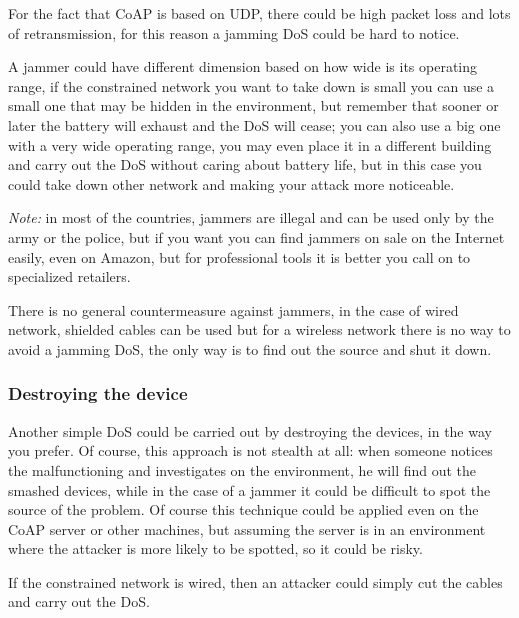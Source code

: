 	For the fact that CoAP is based on UDP, there could be high packet loss and lots of retransmission, for this reason a jamming DoS could be hard to notice.\newline
	
	A jammer could have different dimension based on how wide is its operating range, if the constrained network you want to take down is small you can use a small one that may be hidden in the environment, but remember that sooner or later the battery will exhaust and the DoS will cease; you can also use a big one with a very wide operating range, you may even place it in a different building and carry out the DoS without caring about battery life, but in this case you could take down other network and making your attack more noticeable.\newline
	
	\emph{Note:} in most of the countries, jammers are illegal and can be used only by the army or the police, but if you want you can find jammers on sale on the Internet easily, even on Amazon, but for professional tools it is better you call on to specialized retailers.\newline
	
	There is no general countermeasure against jammers, in the case of wired network, shielded cables can be used but for a wireless network there is no way to avoid a jamming DoS, the only way is to find out the source and shut it down.\newline
	
	\subsubsection{Destroying the device}
	Another simple DoS could be carried out by destroying the devices, in the way you prefer.\newline
	Of course, this approach is not stealth at all: when someone notices the malfunctioning and investigates on the environment, he will find out the smashed devices, while in the case of a jammer it could be difficult to spot the source of the problem.\newline
	Of course this technique could be applied even on the CoAP server or other machines, but assuming the server is in an environment where the attacker is more likely to be spotted, so it could be risky.\newline
	
	If the constrained network is wired, then an attacker could simply cut the cables and carry out the DoS.\newline
	
